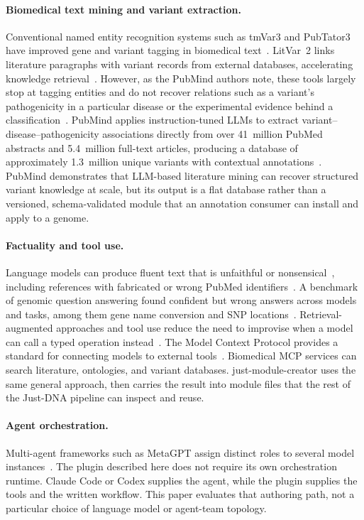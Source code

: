 \documentclass[11pt,a4paper]{article}
\begin{document}
\paragraph{Biomedical text mining and variant extraction.}
Conventional named entity recognition systems such as tmVar3 and PubTator3
have improved gene and variant tagging in biomedical
text~\citep{wei2022tmvar3,wei2024pubtator3}. LitVar~2 links literature
paragraphs with variant records from external databases, accelerating
knowledge retrieval~\citep{allot2023litvar2}. However, as the PubMind authors
note, these tools largely stop at tagging entities and do not recover relations
such as a variant's pathogenicity in a particular disease or the experimental
evidence behind a classification~\citep{wang2026pubmind}. PubMind applies
instruction-tuned LLMs to extract variant--disease--pathogenicity associations
directly from over 41~million PubMed abstracts and 5.4~million full-text
articles, producing a database of approximately 1.3~million unique variants
with contextual annotations~\citep{wang2026pubmind}. PubMind demonstrates
that LLM-based literature mining can recover structured variant knowledge at
scale, but its output is a flat database rather than a versioned,
schema-validated module that an annotation consumer can install and apply to a
genome.

\paragraph{Factuality and tool use.}
Language models can produce fluent text that is unfaithful or
nonsensical~\citep{ji2023survey}, including references with fabricated or wrong
PubMed identifiers~\citep{bhattacharyya2023high}. A benchmark of genomic
question answering found confident but wrong answers across models and tasks,
among them gene name conversion and SNP locations~\citep{shang2025geneturing}. Retrieval-augmented approaches and
tool use reduce the need to improvise when a model can call a typed operation
instead~\citep{schick2023toolformer,jin2024genegpt}. The Model Context Protocol
provides a standard for connecting models to external
tools~\citep{anthropic2024mcp}. Biomedical MCP services can search literature,
ontologies, and variant databases. just-module-creator uses the same general
approach, then carries the result into module files that the rest of the
Just-DNA pipeline can inspect and reuse.

\paragraph{Agent orchestration.}
Multi-agent frameworks such as MetaGPT assign distinct roles to several model
instances~\citep{hong2023metagpt}. The plugin described here does not require
its own orchestration runtime. Claude Code or Codex supplies the agent, while
the plugin supplies the tools and the written workflow. This paper evaluates
that authoring path, not a particular choice of language model or agent-team
topology.
\end{document}
